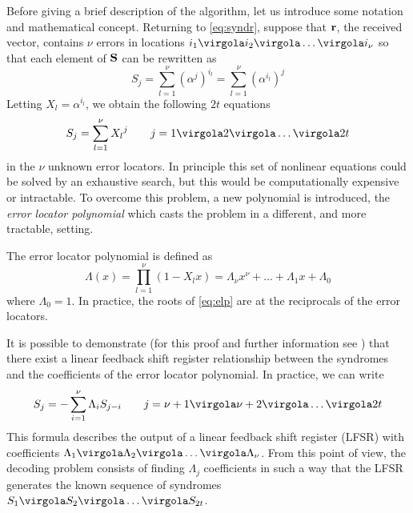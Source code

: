 Before giving a brief description of the algorithm, let us introduce some notation and mathematical concept. Returning to \eqref{eq:syndr}, suppose that \(\mathbf{r}\), the received vector, contains \(\nu\) errors in locations \( i_1 \virgola i_2 \virgola \ldots \virgola i_{\nu}\) so that each element of \(\mathbf{S}\) can be rewritten as
\begin{equation}
S_j = \sum_{l =1}^{\nu} {{(\alpha^j)}^{i_l}} = \sum_{l =1}^{\nu} {{(\alpha^{i_l})}^j}
\end{equation}
Letting \(X_l = \alpha^{i_l}\), we obtain the following \(2t\) equations
\begin{equation}
S_j = \sum_{l =1}^{\nu} {{X_l}^j} \qquad j = 1\virgola 2\virgola \ldots \virgola 2t
\end{equation}
in the \(\nu\) unknown error locators. In principle this set of nonlinear equations could be solved by an exhaustive search, but this would be computationally expensive or intractable.
To overcome this problem, a new polynomial is introduced, the \emph{error locator polynomial} which casts the problem in a different, and more tractable, setting.

The error locator polynomial is defined as
\begin{equation} \label{eq:elp}
\Lambda(x) = \prod_{l = 1}^{\nu} {(1-X_lx)} = \Lambda_{\nu}x^{\nu} + \ldots +\Lambda_1x + \Lambda_0
\end{equation}
where \(\Lambda_0 = 1\). In practice, the roots of \eqref{eq:elp} are at the reciprocals of the error locators.

It is possible to demonstrate (for this proof and further information see \cite{b:moon}) that there exist a linear feedback shift register relationship between the syndromes and the coefficients of the error locator polynomial. In practice, we can write
\begin{equation} \label{eq:SynLocLFSR}
S_j = - \sum_{i = 1}^{\nu} {\Lambda_i S_{j-i}} \qquad j = \nu+1 \virgola \nu + 2 \virgola \ldots \virgola 2t
\end{equation}
This formula describes the output of a linear feedback shift register (LFSR) with coefficients \(\Lambda_1 \virgola  \Lambda_2 \virgola \ldots \virgola \Lambda_{\nu} \). From this point of view, the decoding problem consists of finding \(\Lambda_j\) coefficients in such a way that the LFSR generates the known sequence of syndromes \(S_1\virgola S_2\virgola \ldots \virgola S_{2t}\).

